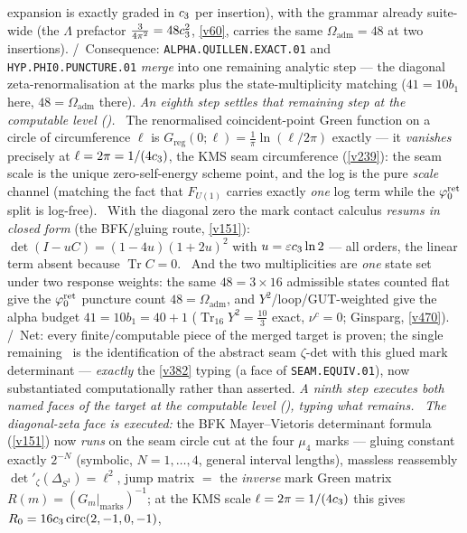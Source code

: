 expansion is exactly graded in $c_3$ per insertion), with the grammar already suite-wide (the
$\Lambda$ prefactor $\tfrac{3}{4\pi^2}=48c_3^2$, \vref{v60}, carries the same $\Omega_{\mathrm{adm}}=48$
at two insertions). \mC/\mO\ Consequence: \texttt{ALPHA.QUILLEN.EXACT.01} and \texttt{HYP.PHI0.PUNCTURE.01}
\emph{merge} into one remaining analytic step --- the diagonal zeta-renormalisation at the marks plus the
state-multiplicity matching ($41=10b_1$ here, $48=\Omega_{\mathrm{adm}}$ there).
\emph{An eighth step settles that remaining step at the computable level
().} \mE\ The renormalised coincident-point Green function on a
circle of circumference $\ell$ is $G_{\mathrm{reg}}(0;\ell)=\tfrac1\pi\ln(\ell/2\pi)$ exactly --- it
\emph{vanishes} precisely at $\ell=2\pi=1/(4c_3)$, the KMS seam circumference (\vref{v239}): the seam
scale is the unique zero-self-energy scheme point, and the log is the pure \emph{scale} channel (matching
the fact that $F_{U(1)}$ carries exactly \emph{one} log term while the $\varphi_0^{\mathrm{ret}}$ split is log-free). \mE\
With the diagonal zero the mark contact calculus \emph{resums in closed form} (the BFK/gluing route,
\vref{v151}): $\det(I-uC)=(1-4u)(1+2u)^2$ with $u=\varepsilon c_3\ln2$ --- all orders, the linear term
absent because $\operatorname{Tr}C=0$. \mE\ And the two multiplicities are \emph{one} state set under two
response weights: the same $48=3\times16$ admissible states counted flat give the $\varphi_0^{\mathrm{ret}}$ puncture count
$48=\Omega_{\mathrm{adm}}$, and $Y^2$/loop/GUT-weighted give the alpha budget $41=10b_1=40+1$
($\operatorname{Tr}_{16}Y^2=\tfrac{10}3$ exact, $\nu^c=0$; Ginsparg, \vref{v470}). \mC/\mO\ Net: every
finite/computable piece of the merged target is proven; the single remaining \mO\ is the identification of
the abstract seam $\zeta$-det with this glued mark determinant --- \emph{exactly} the \vref{v382} typing
(a face of \texttt{SEAM.EQUIV.01}), now substantiated computationally rather than asserted.
\emph{A ninth step executes both named faces of the target at the computable level
(\veri{v974\_alpha\_faces\_computed.py}), typing what remains.} \mE\ \emph{The diagonal-zeta face is
executed:} the BFK Mayer--Vietoris determinant formula (\vref{v151}) now \emph{runs} on the seam circle
cut at the four $\mu_4$ marks --- gluing constant exactly $2^{-N}$ (symbolic, $N=1,\dots,4$, general
interval lengths), massless reassembly $\det\nolimits'_\zeta(\Delta_{S^1})=\ell^2$, jump matrix $=$ the
\emph{inverse} mark Green matrix $R(m)=(G_m|_{\mathrm{marks}})^{-1}$; at the KMS scale
$\ell=2\pi=1/(4c_3)$ this gives $R_0=16c_3\,\mathrm{circ}(2,-1,0,-1)$,
